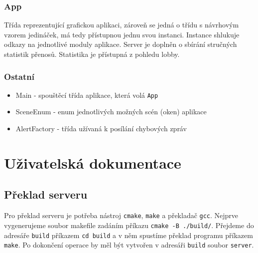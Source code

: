\documentclass[12pt, a4paper]{article} %
\begin{document}
	\subsubsection{App}
	\par Třída reprezentující grafickou aplikaci, zároveň se jedná o třídu s návrhovým vzorem jedináček, má tedy přístupnou jednu svou instanci. Instance shlukuje odkazy na jednotlivé moduly aplikace. Server je doplněn o sbírání stručných statistik přenosů. Statistika je přístupná z pohledu lobby.
	
	\subsubsection{Ostatní}
	\begin{itemize}
		\item Main - spouštěcí třída aplikace, která volá \texttt{App}
		\item SceneEnum - enum jednotlivých možných scén (oken) aplikace
		\item AlertFactory - třída užívaná k posílání chybových zpráv
	\end{itemize}
	
	\section{Uživatelská dokumentace}
	\subsection{Překlad serveru}
	\par Pro překlad serveru je potřeba nástroj \texttt{cmake}, \texttt{make} a překladač \texttt{gcc}. Nejprve vygenerujeme soubor makefile zadáním příkazu \texttt{cmake -B ./build/}. Přejdeme do adresáře \texttt{build} příkazem \texttt{cd build} a v něm spustíme překlad programu příkazem \texttt{make}. Po dokončení operace by měl být vytvořen v adresáři \texttt{build} soubor \texttt{server}. 
\end{document}

